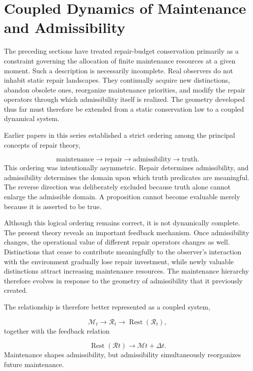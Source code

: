 \documentclass[12pt,oneside]{article}
\theoremstyle{plain}
\theoremstyle{definition}
\theoremstyle{remark}
\DeclareMathOperator{\Rest}{Rest}
\begin{document}
\section{Coupled Dynamics of Maintenance and Admissibility}

The preceding sections have treated repair-budget conservation primarily as a constraint governing the allocation of finite maintenance resources at a given moment. Such a description is necessarily incomplete. Real observers do not inhabit static repair landscapes. They continually acquire new distinctions, abandon obsolete ones, reorganize maintenance priorities, and modify the repair operators through which admissibility itself is realized. The geometry developed thus far must therefore be extended from a static conservation law to a coupled dynamical system.

Earlier papers in this series established a strict ordering among the principal concepts of repair theory,

\[
\text{maintenance}
\longrightarrow
\text{repair}
\longrightarrow
\text{admissibility}
\longrightarrow
\text{truth}.
\]
This ordering was intentionally asymmetric. Repair determines admissibility, and admissibility determines the domain upon which truth predicates are meaningful. The reverse direction was deliberately excluded because truth alone cannot enlarge the admissible domain. A proposition cannot become evaluable merely because it is asserted to be true.

Although this logical ordering remains correct, it is not dynamically complete. The present theory reveals an important feedback mechanism. Once admissibility changes, the operational value of different repair operators changes as well. Distinctions that cease to contribute meaningfully to the observer's interaction with the environment gradually lose repair investment, while newly valuable distinctions attract increasing maintenance resources. The maintenance hierarchy therefore evolves in response to the geometry of admissibility that it previously created.

The relationship is therefore better represented as a coupled system,

\[
\mathcal{M}_t
\longrightarrow
\mathcal{R}_t
\longrightarrow
\Rest(\mathcal{R}_t),
\]
together with the feedback relation

\[
\Rest(\mathcal{R}t)
\longrightarrow
\mathcal{M}{t+\Delta t}.
\]
Maintenance shapes admissibility, but admissibility simultaneously reorganizes future maintenance.
\end{document}
